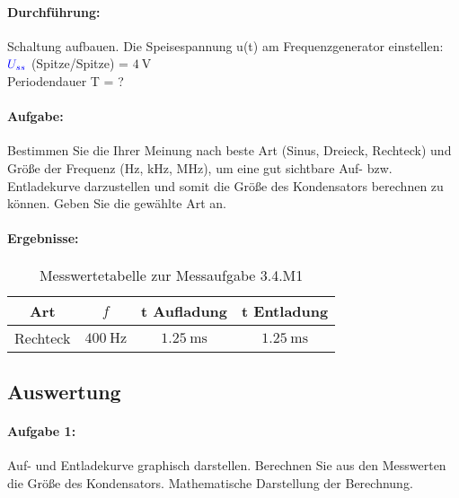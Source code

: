 \documentclass[11pt,a4paper,titlepage]{scrreprt}
\begin{document}
                    \paragraph{Durchführung:}Schaltung aufbauen. Die Speisespannung u(t) am Frequenzgenerator einstellen:\\
					$\textcolor{blue}{U_{ss}}$ (Spitze/Spitze) = $\SI{4}{\volt}$\\
					Periodendauer T = ?
                    \paragraph{Aufgabe:}Bestimmen Sie die Ihrer Meinung nach beste Art (Sinus, Dreieck, Rechteck) und Größe der Frequenz (Hz, kHz, MHz), um eine gut sichtbare Auf- bzw. Entladekurve
darzustellen und somit die Größe des Kondensators berechnen zu können. Geben Sie
die gewählte Art an.
					\pagebreak
            		\paragraph{Ergebnisse:}
            		\begin{center}
                       \begin{table}[!hbtp]
                           \caption{Messwertetabelle zur Messaufgabe 3.4.M1}
                           \label{tbl:messergebnisse3.4}
                           \renewcommand{\arraystretch}{1.3}
                           \begin{center}
                               \begin{tabular}{cccc}
									Art & $f$ & t Aufladung & t Entladung\\ \hline
									Rechteck & $\SI{400}{\Hz}$ & $\SI{1,25}{\milli\second}$ & $\SI{1,25}{\milli\second}$
							   \end{tabular}
                           \end{center}
                       \end{table}
                   \end{center}
            \subsection{Auswertung}
                \paragraph{Aufgabe 1:}Auf- und Entladekurve graphisch darstellen. Berechnen Sie aus den Messwerten die Größe des Kondensators. Mathematische Darstellung der Berechnung.
                	  
\end{document}

